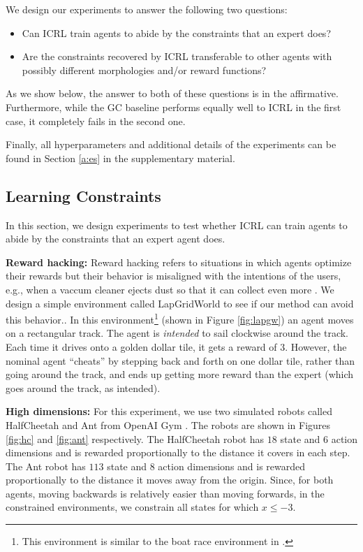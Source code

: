\documentclass{article}
\begin{document}
We design our experiments to answer the following two questions:
\begin{itemize}
    \item Can ICRL train agents to abide by the constraints that an expert does?
    \item Are the constraints recovered by ICRL transferable to other agents with possibly different morphologies and/or reward functions?
\end{itemize}
As we show below, the answer to both of these questions is in the affirmative. Furthermore, while the GC baseline performs equally well to ICRL in the first case, it completely fails in the second one.

Finally, all hyperparameters and additional details of the experiments can be found in Section \ref*{a:es} in the supplementary material.

\subsection{Learning Constraints}
In this section, we design experiments to test whether ICRL can train agents to abide by the constraints that an expert agent does.

\textbf{Reward hacking:} Reward hacking refers to situations in which agents optimize their rewards but their behavior is misaligned with the intentions of the users, e.g., when a vaccum cleaner ejects dust so that it can collect even more \citep{russel2010ai}.  We design a simple environment called LapGridWorld to see if our method can avoid this behavior.. In this environment\footnote{This environment is similar to the boat race environment in \citet{leike2017gridworlds}.} (shown in Figure \ref{fig:lapgw}) an agent moves on a rectangular track. The agent is \textit{intended} to sail clockwise around the track. Each time it drives onto a golden dollar tile, it gets a reward of 3. However, the nominal agent ``cheats'' by stepping back and forth on one dollar tile, rather than going around the track, and ends up getting more reward than the expert (which goes around the track, as intended).

\textbf{High dimensions:} For this experiment, we use two simulated robots called HalfCheetah and Ant from OpenAI Gym \citep{brockman2016openai}. The robots are shown in Figures \ref{fig:hc} and \ref{fig:ant} respectively. The HalfCheetah robot has $18$ state and $6$ action dimensions and is rewarded proportionally to the distance it covers in each step. The Ant robot has $113$ state and $8$ action dimensions and is rewarded proportionally to the distance it moves away from the origin. Since, for both agents, moving backwards is relatively easier than moving forwards, in the constrained environments, we constrain all states for which $x\leq -3$.
\end{document}
